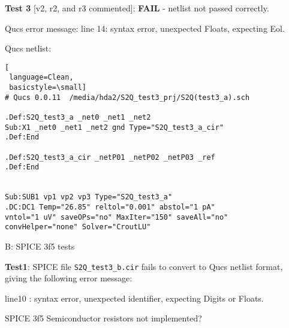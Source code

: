 \begin{flushleft}

\textbf{Test 3} [v2, r2, and r3 commented]: \textbf{FAIL} - netlist not passed correctly.

Qucs error message: line 14: syntax error, unexpected Floats, expecting Eol.

\end{flushleft}

Qucs netlist:
\begin{lstlisting}[
 language=Clean, 
 basicstyle=\small]
# Qucs 0.0.11  /media/hda2/S2Q_test3_prj/S2Q(test3_a).sch

.Def:S2Q_test3_a _net0 _net1 _net2
Sub:X1 _net0 _net1 _net2 gnd Type="S2Q_test3_a_cir"
.Def:End

.Def:S2Q_test3_a_cir _netP01 _netP02 _netP03 _ref
.Def:End


Sub:SUB1 vp1 vp2 vp3 Type="S2Q_test3_a"
.DC:DC1 Temp="26.85" reltol="0.001" abstol="1 pA" 
vntol="1 uV" saveOPs="no" MaxIter="150" saveAll="no"
convHelper="none" Solver="CroutLU"

\end{lstlisting}


\begin{flushleft}
B: SPICE 3f5 tests

\textbf{Test1}: SPICE file \verb|S2Q_test3_b.cir| fails to convert to Qucs netlist format, giving the following error message:

line10 : syntax error, unexpected identifier, expecting Digits or Floats.

SPICE 3f5 Semiconductor resistors not implemented?
\end{flushleft}



